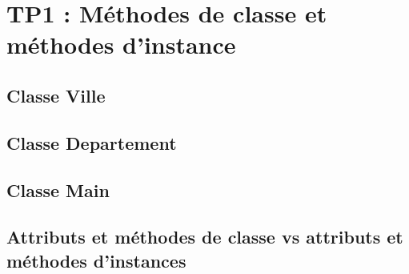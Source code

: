 \chapter{TP1 : Méthodes de classe et méthodes d'instance}

\section{Classe Ville}

\section{Classe Departement}

\section{Classe Main}

\section{Attributs et méthodes de classe vs attributs et méthodes d'instances}
